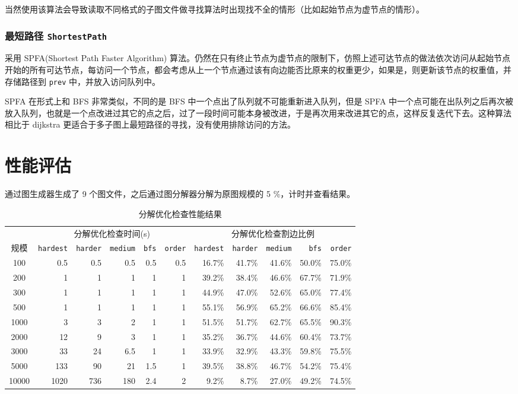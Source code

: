 \documentclass[a4paper,12pt]{article}
\begin{document}
\begin{CJK}{UTF8}{song}
当然使用该算法会导致读取不同格式的子图文件做寻找算法时出现找不全的情形（比如起始节点为虚节点的情形）。

\hypertarget{header-n211}{%
\subsubsection{\texorpdfstring{最短路径
\texttt{ShortestPath}}{最短路径 ShortestPath}}\label{header-n211}}

采用 SPFA(Shortest Path Faster Algorithm) 算法。仍然在只有终止节点为虚节点的限制下，仿照上述可达节点的做法依次访问从起始节点开始的所有可达节点，每访问一个节点，都会考虑从上一个节点通过该有向边能否比原来的权重更少，如果是，则更新该节点的权重值，并存储路径到 \texttt{prev} 中，并放入访问队列中。

SPFA 在形式上和 BFS 非常类似，不同的是 BFS 中一个点出了队列就不可能重新进入队列，但是 SPFA 中一个点可能在出队列之后再次被放入队列，也就是一个点改进过其它的点之后，过了一段时间可能本身被改进，于是再次用来改进其它的点，这样反复迭代下去。这种算法相比于
dijkstra 更适合于多子图上最短路径的寻找，没有使用排除访问的方法。

\section{性能评估}

通过图生成器生成了 9 个图文件，之后通过图分解器分解为原图规模的 5 \%，计时并查看结果。

\begin{table}[H]
    \centering
    \caption{分解优化检查性能结果}
    \begin{tabular}{c|rrrrr|rrrrr}{}
    &\multicolumn{5}{c}{分解优化检查时间(s)} & \multicolumn{5}{c}{分解优化检查割边比例} \\
    规模 & \texttt{hardest} & \texttt{harder} & \texttt{medium} & \texttt{bfs} & \texttt{order} & \texttt{hardest} & \texttt{harder} & \texttt{medium} & \texttt{bfs} & \texttt{order} \\
    \hline
    100 & 0.5 &0.5 &0.5	&0.5	&0.5 & 16.7\% & 41.7\% & 41.6\% & 50.0\% & 75.0\% \\
    200 & 1	&1	&1	&1	&1 & 39.2\% & 38.4\% & 46.6\% & 67.7\% & 71.9\% \\
    300 & 1 &1	&1	&1	&1 & 44.9\% & 47.0\% & 52.6\% & 65.0\% & 77.4\% \\
    500 &1	&1	&1	&1	&1  & 55.1\% & 56.9\% & 65.2\% & 66.6\% & 85.4\% \\
    1000 &3	&3	&2	&1	&1 & 51.5\% & 51.7\% & 62.7\% & 65.5\% & 90.3\% \\
    2000 &12	&9	&3	&1	&1 & 35.2\% & 36.7\% & 44.6\% & 60.4\% & 73.7\% \\
    3000 &33	&24	&6.5	&1	&1 & 33.9\% & 32.9\% & 43.3\% & 59.8\% & 75.5\% \\
    5000 &133	&90	&21	&1.5	&1 & 39.5\% & 38.8\% & 46.7\% & 54.2\% & 75.4\% \\
    10000 &1020	&736	&180	&2.4	&2 & 9.2\% & 8.7\% & 27.0\% & 49.2\% & 74.5\% \\
    \hline
    \end{tabular}
\end{table}


\end{CJK}
\end{document}
